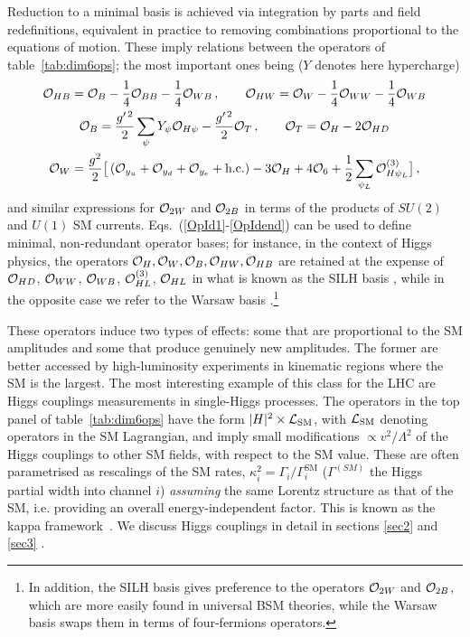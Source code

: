 Reduction to a minimal basis is achieved via  integration by parts and  field redefinitions, equivalent in practice to removing combinations proportional to the equations of motion. 
These imply  relations between the operators of table~\ref{tab:dim6ops}; the most important ones being ($Y$ denotes here  hypercharge)
\begin{gather}
{\cal O}_{HB}={\cal O}_{B}-\frac{1}{4}{\cal O}_{BB}-\frac{1}{4}{\cal O}_{WB}\,,\quad \quad {\cal O}_{HW}={\cal O}_W-\frac{1}{4}{\cal O}_{WW}-\frac{1}{4}{\cal O}_{WB}\label{OpId1}\\
{\cal O}_B= \frac{g^{\prime\, 2}}{2}\sum_\psi Y_\psi {\cal O}_{H\psi}  -\frac{g^{\prime\, 2}}{2}{\cal O}_T\,,\quad\quad  {\cal O}_T={\cal O}_H-2{\cal O}_{HD}\\
{\cal O}_W= \frac{g^2}{2}\big[\left({\cal O}_{y_u}+{\cal O}_{y_d}+{\cal O}_{y_e}+\text{h.c.}\right)-3{\cal O}_{H}+4{\cal O}_{6} +  \frac{1}{2}\sum_{\psi_L} {\cal O}_{H\psi_L}^{(3)}\big]\, ,
 \label{OpIdend}
\end{gather}
and similar expressions for ${\cal O}_{2W}$ and ${\cal O}_{2B}$ in terms of the products of $SU(2)$ and $U(1)$ SM currents.
Eqs.~(\ref{OpId1}-\ref{OpIdend}) can be used to define minimal,  non-redundant operator bases; for instance, in the context of Higgs physics, the operators ${\cal O}_H,{\cal O}_W, {\cal O}_B,{\cal O}_{HW},{\cal O}_{HB}$ are retained  at the expense of  ${\cal O}_{HD}$, ${\cal O}_{WW}$, ${\cal O}_{WB}$, ${\cal O}_{HL}^{(3)}$, ${\cal O}_{HL}$ in what is known as the SILH basis \cite{Giudice:2007fh}, while in the opposite case  we refer to the Warsaw basis \cite{Grzadkowski:2010es}.\footnote{In addition, the SILH basis gives preference to the operators ${\cal O}_{2W}$ and  ${\cal O}_{2B}$, which are more easily found in universal BSM theories, while the Warsaw basis swaps them in terms of four-fermions operators.}



These operators induce two types of effects: some that are proportional to the SM amplitudes and some that  produce  genuinely new amplitudes. The former are  better accessed by high-luminosity experiments in kinematic regions where the SM is the largest. The most interesting example of this class for the LHC are  Higgs couplings measurements in single-Higgs processes. 
The operators in the top panel of table~\ref{tab:dim6ops}  have the form 
$|H|^2 \times {\cal L}_{\textrm{SM}}$, with ${\cal L}_{\textrm{SM}}$ denoting operators in the SM Lagrangian, and  imply small modifications $\propto v^2/\Lambda^2$  of the Higgs couplings to other SM fields, with respect to the SM value.
These are often parametrised as rescalings of the SM rates, $\kappa_{i}^2=\Gamma_{i}/\Gamma^{\textrm{SM}}_{i}$ ($\Gamma^{(SM)}$ the  Higgs partial width into channel $i$)  \emph{assuming} the same Lorentz structure as that of the SM, i.e. providing an overall energy-independent factor. This is known as the kappa framework~\cite{Heinemeyer:2013tqa}. We discuss Higgs couplings in detail in sections \ref{sec2} and \ref{sec3} .

